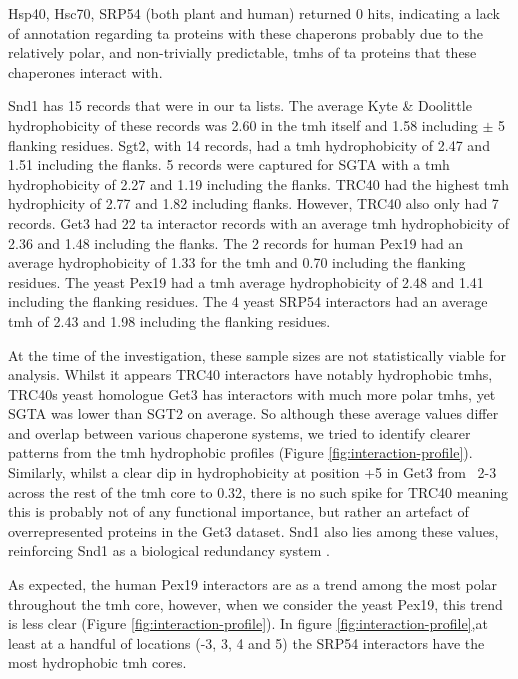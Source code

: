 Hsp40, Hsc70, SRP54 (both plant and human) returned 0 hits, indicating a lack of annotation regarding \gls{ta} proteins with these chaperons probably due to the relatively polar, and non-trivially predictable, \gls{tmh}s of \gls{ta} proteins that these chaperones interact with.

Snd1 has 15 records that were in our \gls{ta} lists.
The average Kyte \& Doolittle hydrophobicity of these records was 2.60 in the \gls{tmh} itself and 1.58 including $\pm$ 5 flanking residues.
Sgt2, with 14 records, had a \gls{tmh} hydrophobicity of 2.47 and 1.51 including the flanks.
5 records were captured for SGTA with a \gls{tmh} hydrophobicity of 2.27 and 1.19 including the flanks.
TRC40 had the highest \gls{tmh} hydrophicity of 2.77 and 1.82 including flanks.
However, TRC40 also only had 7 records.
Get3 had 22 \gls{ta} interactor records with an average \gls{tmh} hydrophobicity of 2.36 and 1.48 including the flanks.
The 2 records for human Pex19 had an average hydrophobicity of 1.33 for the \gls{tmh} and 0.70 including the flanking residues.
The yeast Pex19 had a \gls{tmh} average hydrophobicity of 2.48 and 1.41 including the flanking residues.
The 4 yeast SRP54 interactors had an average \gls{tmh} of 2.43 and 1.98 including the flanking residues.

At the time of the investigation, these sample sizes are not statistically viable for analysis.
Whilst it appears TRC40 interactors have notably hydrophobic \gls{tmh}s, TRC40s yeast homologue Get3 has interactors with much more polar \gls{tmh}s, yet SGTA was lower than SGT2 on average.
So although these average values differ and overlap between various chaperone systems, we tried to identify clearer patterns from the \gls{tmh} hydrophobic profiles (Figure \ref{fig:interaction-profile}).
Similarly, whilst a clear dip in hydrophobicity at position +5 in Get3 from ~2-3 across the rest of the \gls{tmh} core to 0.32, there is no such spike for TRC40 meaning this is probably not of any functional importance, but rather an artefact of overrepresented proteins in the Get3 dataset.
Snd1 also lies among these values, reinforcing Snd1 as a biological redundancy system \cite{Rabu2009, Johnson2013, Schuldiner2008}.

As expected, the human Pex19 interactors are as a trend among the most polar throughout the \gls{tmh} core, however, when we consider the yeast Pex19, this trend is less clear (Figure \ref{fig:interaction-profile}). In figure \ref{fig:interaction-profile},at least at a handful of locations (-3, 3, 4 and 5) the SRP54 interactors have the most hydrophobic \gls{tmh} cores.

